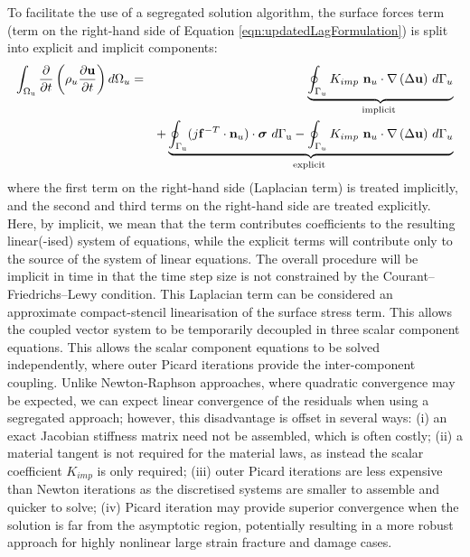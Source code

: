 \documentclass[sn-mathphys,Numbered,draft]{sn-jnl}%
\begin{document}
To facilitate the use of a segregated solution algorithm, the surface forces term (term on the right-hand side of Equation \ref{eqn:updatedLagFormulation}) is split into explicit and implicit components:
\begin{eqnarray} \label{eqn:MomentumImplicitExplicit}
	\int_{\mathrm{\Omega_u}} \frac{\partial }{\partial t} \left( \rho_u \frac{\partial \mathbf{u} }{\partial t} \right) d\mathrm{\Omega}_u
	&=&
	\underbrace{\oint_{\mathrm{\Gamma}_u}{K_{imp}\  \mathbf{n}_u\cdot\mathrm{\nabla}\left(\mathrm{\Delta \mathbf{u}}\right)}\ d\mathrm{\Gamma}_u}_{\text {implicit }} \notag \\
    &&+
    \underbrace{
    \oint_{\mathrm{\Gamma_u}}(j\mathbf{f}^{-T}\cdot{\mathbf{n}_u)\cdot\boldsymbol{\sigma}}\ d\mathrm{\Gamma_u}
    - 
    \oint_{\mathrm{\Gamma}_u}{K_{imp}\ 
 \mathbf{n}_u\cdot\mathrm{\nabla}\left(\mathrm{\Delta \mathbf{u}}\right)}\ d\mathrm{\Gamma}_u
 }_{\text {explicit }}  %
\end{eqnarray}
where the first term on the right-hand side (Laplacian term) is treated implicitly, and the second and third terms on the right-hand side are treated explicitly.
Here, by implicit, we mean that the term contributes coefficients to the resulting linear(-ised) system of equations, while the explicit terms will contribute only to the source of the system of linear equations.
The overall procedure will be implicit in time in that the time step size is not constrained by the Courant–Friedrichs–Lewy condition.
This Laplacian term can be considered an approximate compact-stencil linearisation of the surface stress term.
This allows the coupled vector system to be temporarily decoupled in three scalar component equations.
This allows the scalar component equations to be solved independently, where outer Picard iterations provide the inter-component coupling.
Unlike Newton-Raphson approaches, where quadratic convergence may be expected, we can expect linear convergence of the residuals when using a segregated approach; however, this disadvantage is offset in several ways: (i) an exact Jacobian stiffness matrix need not be assembled, which is often costly; (ii) a material tangent is not required for the material laws, as instead the scalar coefficient $K_{imp}$ is only required; (iii) outer Picard iterations are less expensive than Newton iterations as the discretised systems are smaller to assemble and quicker to solve; (iv) Picard iteration may provide superior convergence when the solution is far from the asymptotic region, potentially resulting in a more robust approach for highly nonlinear large strain fracture and damage cases.
\end{document}
